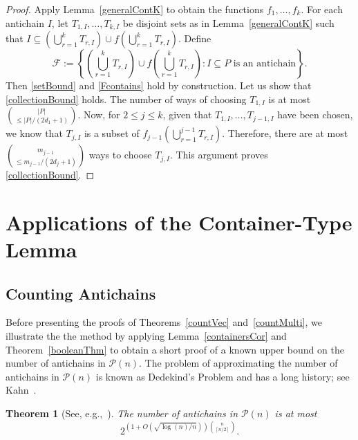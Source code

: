 \documentclass[11 pt]{article}
\newtheorem{thm}[equation]{Theorem}
\theoremstyle{definition}
\theoremstyle{case}
\numberwithin{equation}{section}
\begin{document}
\begin{proof}
Apply Lemma~\ref{generalContK} to obtain the functions $f_1,\dots,f_k$. For each antichain $I$, let $T_{1,I},\dots,T_{k,I}$ be disjoint sets as in Lemma~\ref{generalContK} such that $I\subseteq \left(\bigcup_{r=1}^kT_{r,I}\right)\cup f\left(\bigcup_{r=1}^kT_{r,I}\right)$.
 Define
\[\mathcal{F}:=\left\{\left(\bigcup_{r=1}^kT_{r,I}\right)\cup f\left(\bigcup_{r=1}^kT_{r,I}\right): I\subseteq P\text{ is an antichain}\right\}.\]
Then \eqref{setBound} and \eqref{Fcontains} hold by construction. Let us show that \eqref{collectionBound} holds. The number of ways of choosing $T_{1,I}$ is at most $\binom{|P|}{\leq |P|/(2d_1+1)}$. Now, for $2\leq j\leq k$, given that $T_{1,I},\dots,T_{j-1,I}$ have been chosen, we know that $T_{j,I}$ is a subset of $f_{j-1}\left(\bigcup_{r=1}^{j-1}T_{r,I}\right)$. Therefore, there are at most $\binom{m_{j-1}}{\leq m_{j-1}/(2d_{j}+1)}$ ways to choose $T_{j,I}$. This argument proves \eqref{collectionBound}. 
\end{proof}


\section{Applications of the Container-Type Lemma}
\label{countAnti}

\subsection{Counting Antichains}

Before presenting the proofs of Theorems~\ref{countVec} and~\ref{countMulti}, we illustrate the the method by applying Lemma~\ref{containersCor} and Theorem~\ref{booleanThm} to obtain a short proof of a known upper bound on the number of antichains in $\mathcal{P}(n)$. The problem of approximating the number of antichains in $\mathcal{P}(n)$ is known as Dedekind's Problem and has a long history; see Kahn~\cite{KahnAnti}.

\begin{thm}[See, e.g.,~\cite{KahnAnti}]
\label{countBoolean}
The number of antichains in $\mathcal{P}(n)$ is at most \[2^{\left(1+O\left(\sqrt{\log(n)/n}\right)\right)\binom{n}{\left\lceil n/2\right\rceil}}.\] 
\end{thm}
\end{document}
